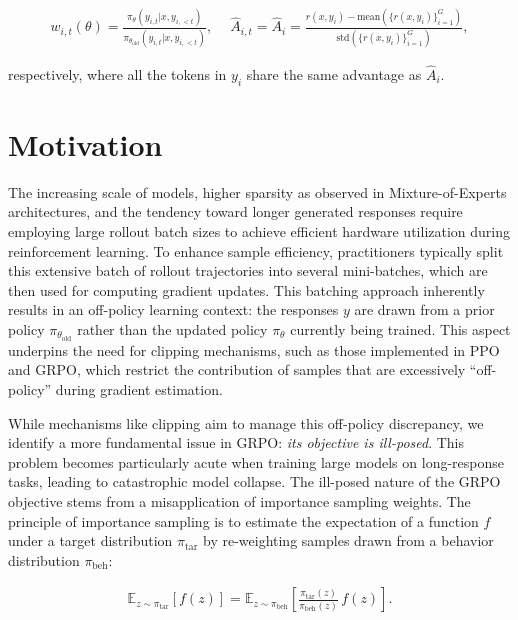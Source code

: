 \begin{align}
    w_{i,t}(\theta)=\frac{ \pi_{\theta} (y_{i,t} | x, y_{i,<t}) }{ \pi_{\theta_\text{old}} (y_{i,t} | x,y_{i,<t})},\quad\ 
    \widehat{A}_{i,t} = \widehat{A}_{i} = \frac{r(x, y_i) - \mathrm{mean} \left( \{ r(x, y_i) \}_{i=1}^G \right) }{ \mathrm{std} \left( \{ r(x, y_i) \}_{i=1}^G \right) },
\end{align}

respectively, where all the tokens in $y_i$ share the same advantage as $\widehat{A}_{i}$.

\section{Motivation}
\label{sec:motivation}

The increasing scale of models, higher sparsity as observed in Mixture-of-Experts architectures, and the tendency toward longer generated responses require employing large rollout batch sizes to achieve efficient hardware utilization during reinforcement learning. To enhance sample efficiency, practitioners typically split this extensive batch of rollout trajectories into several mini-batches, which are then used for computing gradient updates. This batching approach inherently results in an off-policy learning context: the responses $y$ are drawn from a prior policy $\pi_{\theta_\text{old}}$ rather than the updated policy $\pi_\theta$ currently being trained. This aspect underpins the need for clipping mechanisms, such as those implemented in PPO and GRPO, which restrict the contribution of samples that are excessively ``off-policy'' during gradient estimation.

While mechanisms like clipping aim to manage this off-policy discrepancy, we identify a more fundamental issue in GRPO: \textit{its objective is ill-posed}. This problem becomes particularly acute when training large models on long-response tasks, leading to catastrophic model collapse. The ill-posed nature of the GRPO objective stems from a misapplication of importance sampling weights. The principle of importance sampling is to estimate the expectation of a function $f$ under a target distribution $\pi_\text{tar}$ by re-weighting samples drawn from a behavior distribution $\pi_\text{beh}$:

\begin{align}
\mathbb{E}_{z \sim \pi_\text{tar}} \left[ f(z) \right] = \mathbb{E}_{z \sim \pi_\text{beh}} \left[ \frac{ \pi_\text{tar} (z) }{ \pi_\text{beh} (z)} \, f(z) \right].
\end{align}

